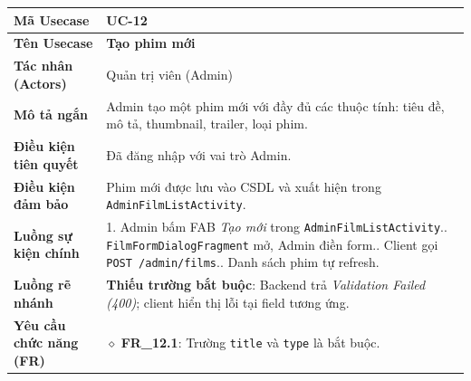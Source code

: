\begin{table}[H]
\renewcommand{\arraystretch}{1.3}
\centering
\begin{tabularx}{\textwidth}{|p{4.5cm}|X|}
\hline
\cellcolor{gray!15}\bfseries Mã Usecase & \textbf{UC-12} \\ \hline
\cellcolor{gray!15}\bfseries Tên Usecase & \textbf{Tạo phim mới} \\ \hline
\cellcolor{gray!15}\bfseries Tác nhân (Actors) & Quản trị viên (Admin) \\ \hline
\cellcolor{gray!15}\bfseries Mô tả ngắn & Admin tạo một phim mới với đầy đủ các thuộc tính: tiêu đề, mô tả, thumbnail, trailer, loại phim. \\ \hline
\cellcolor{gray!15}\bfseries Điều kiện tiên quyết & Đã đăng nhập với vai trò Admin. \\ \hline
\cellcolor{gray!15}\bfseries Điều kiện đảm bảo & Phim mới được lưu vào CSDL và xuất hiện trong \texttt{AdminFilmListActivity}. \\ \hline
\cellcolor{gray!15}\bfseries Luồng sự kiện chính & 1. Admin bấm FAB \textit{Tạo mới} trong \texttt{AdminFilmListActivity}.\newline 2. \texttt{FilmFormDialogFragment} mở, Admin điền form.\newline 3. Client gọi \texttt{POST /admin/films}.\newline 4. Danh sách phim tự refresh. \\ \hline
\cellcolor{gray!15}\bfseries Luồng rẽ nhánh & \textbf{Thiếu trường bắt buộc}: Backend trả \textit{Validation Failed (400)}; client hiển thị lỗi tại field tương ứng. \\ \hline
\cellcolor{gray!15}\bfseries Yêu cầu chức năng (FR) & $\diamond$ \textbf{FR\_12.1}: Trường \texttt{title} và \texttt{type} là bắt buộc. \\ \hline
\end{tabularx}
\end{table}

